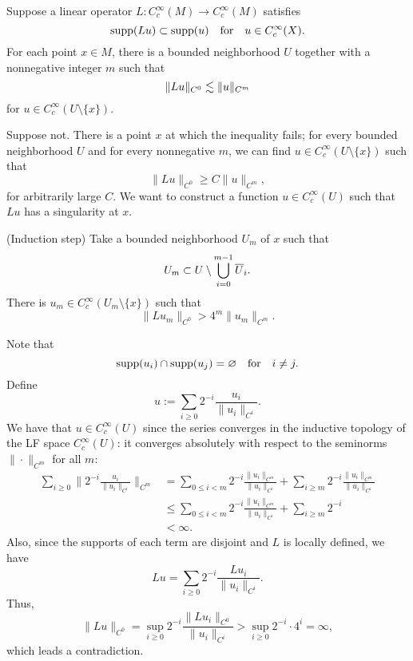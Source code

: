 \documentclass[11pt]{article}
\begin{document}
\begin{lem}
Suppose a linear operator $L:C_c^\infty(M)\to C_c^\infty(M)$ satisfies
\[\operatorname{supp}(Lu)\subset\operatorname{supp}(u)\quad\text{for}\quad u\in C_c^\infty(X).\]
For each point $x\in M$, there is a bounded neighborhood $U$ together with a nonnegative integer $m$ such that 
\[\|Lu\|_{C^0}\lesssim\|u\|_{C^m}\]
for $u\in C_c^\infty(U\setminus\{x\})$.
\end{lem}
\begin{pf}
Suppose not.
There is a point $x$ at which the inequality fails; for every bounded neighborhood $U$ and for every nonnegative $m$, we can find $u\in C_c^\infty(U\setminus\{x\})$ such that
\[\|Lu\|_{C^0}\ge C\|u\|_{C^m},\]
for arbitrarily large $C$.
We want to construct a function $u\in C_c^\infty(U)$ such that $Lu$ has a singularity at $x$.

(Induction step)
Take a bounded neighborhood $U_m$ of $x$ such that
\[U_m\subset U\setminus\bigcup_{i=0}^{m-1}\overline U_i.\]
There is $u_m\in C_c^\infty(U_m\setminus\{x\})$ such that
\[\|Lu_m\|_{C^0}>4^m\|u_m\|_{C^m}.\]

Note that
\[\operatorname{supp}(u_i)\cap\operatorname{supp}(u_j)=\varnothing\quad\text{for}\quad i\ne j.\]
Define
\[u:=\sum_{i\ge0}2^{-i}\frac{u_i}{\|u_i\|_{C^i}}.\]
We have that $u\in C_c^\infty(U)$ since the series converges in the inductive topology of the LF space $C_c^\infty(U)$: it converges absolutely with respect to the seminorms $\|\cdot\|_{C^m}$ for all $m$:
\begin{align*}
\sum_{i\ge0}\|2^{-i}\frac{u_i}{\|u_i\|_{C^i}}\|_{C^m}
&=\sum_{0\le i<m}2^{-i}\frac{\|u_i\|_{C^m}}{\|u_i\|_{C^i}}+\sum_{i\ge m}2^{-i}\frac{\|u_i\|_{C^m}}{\|u_i\|_{C^i}}\\
&\le\sum_{0\le i<m}2^{-i}\frac{\|u_i\|_{C^m}}{\|u_i\|_{C^i}}+\sum_{i\ge m}2^{-i}\\
&<\infty.
\end{align*}
Also, since the supports of each term are disjoint and $L$ is locally defined, we have
\[Lu=\sum_{i\ge0}2^{-i}\frac{Lu_i}{\|u_i\|_{C^i}}.\]
Thus,
\[\|Lu\|_{C^0}=\sup_{i\ge0}2^{-i}\frac{\|Lu_i\|_{C^0}}{\|u_i\|_{C^i}}>\sup_{i\ge0}2^{-i}\cdot4^i=\infty,\]
which leads a contradiction.

\end{pf}
\end{document}

